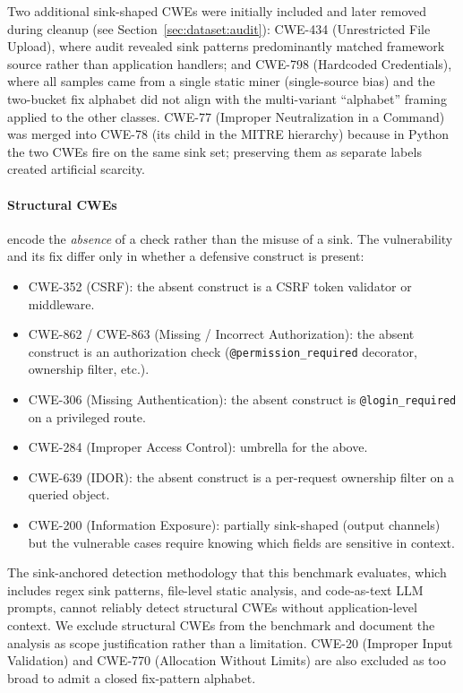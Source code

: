 Two additional sink-shaped CWEs were initially included and later
removed during cleanup (see Section~\ref{sec:dataset:audit}):
CWE-434 (Unrestricted File Upload), where audit revealed sink patterns
predominantly matched framework source rather than application
handlers; and CWE-798 (Hardcoded Credentials), where all samples came
from a single static miner (single-source bias) and the
two-bucket fix alphabet did not align with the multi-variant
``alphabet'' framing applied to the other classes. CWE-77 (Improper
Neutralization in a Command) was merged into CWE-78 (its child in the
MITRE hierarchy) because in Python the two CWEs fire on the same sink
set; preserving them as separate labels created artificial scarcity.

\paragraph{Structural CWEs} encode the \emph{absence} of a check
rather than the misuse of a sink. The vulnerability and its fix
differ only in whether a defensive construct is present:
\begin{itemize}
\item CWE-352 (CSRF): the absent construct is a CSRF token validator
  or middleware.
\item CWE-862 / CWE-863 (Missing / Incorrect Authorization): the
  absent construct is an authorization check
  (\texttt{@permission\_required} decorator, ownership filter, etc.).
\item CWE-306 (Missing Authentication): the absent construct is
  \texttt{@login\_required} on a privileged route.
\item CWE-284 (Improper Access Control): umbrella for the above.
\item CWE-639 (IDOR): the absent construct is a per-request
  ownership filter on a queried object.
\item CWE-200 (Information Exposure): partially sink-shaped (output
  channels) but the vulnerable cases require knowing which fields
  are sensitive in context.
\end{itemize}

The sink-anchored detection methodology that this benchmark evaluates,
which includes regex sink patterns, file-level static analysis, and
code-as-text LLM prompts, cannot reliably detect structural CWEs
without application-level context. We exclude structural CWEs from the
benchmark and document the analysis as scope justification rather
than a limitation. CWE-20 (Improper Input Validation) and CWE-770
(Allocation Without Limits) are also excluded as too broad to admit
a closed fix-pattern alphabet.


